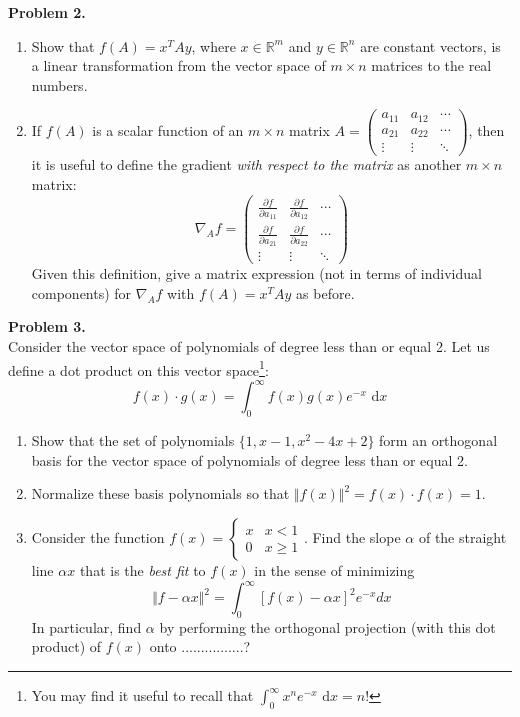 \documentclass[11pt]{article}
\newcommand{\diff}{\,\mathrm{d}}
\begin{document}
\noindent \textbf{Problem 2.}\\
\begin{enumerate}
\item Show that $f(A) = x^T A y$, where $x\in \mathbb{R}^m$ and $y\in \mathbb{R}^n$ are constant vectors, is a linear transformation from the vector space of $m\times n$ matrices to the real numbers.
\item If $f(A)$ is a scalar function of an $m\times n$ matrix $A = \begin{pmatrix} a_{11} & a_{12} & \cdots \\ a_{21} & a_{22} & \cdots \\ \vdots & \vdots & \ddots \end{pmatrix}$, then it is useful to define the gradient \emph{with respect to the matrix} as another $m\times n$ matrix:
$$
\nabla_A f = \begin{pmatrix} \frac{\partial f}{\partial a_{11}} & \frac{\partial f}{\partial a_{12}} & \cdots \\ \frac{\partial f}{\partial a_{21}} & \frac{\partial f}{\partial a_{22}} & \cdots \\ \vdots & \vdots & \ddots \end{pmatrix}
$$
Given this definition, give a matrix expression (not in terms of individual components) for $\nabla_A f$ with $f(A) = x^T A y$ as before.
\end{enumerate}

\newpage

\noindent \textbf{Problem 3.}\\
Consider the vector space of polynomials of degree less than or equal 2. Let us define a dot product on this vector space\footnote{You may find it useful to recall that $\int_0^{\infty} x^n e^{-x}\,\diff x = n!$}:
$$f(x)\cdot g(x) = \int_0^{\infty} f(x)g(x) e^{-x} \, \diff x$$
\begin{enumerate}
\item Show that the set of polynomials $\{1, x-1,x^2-4x+2 \}$ form an orthogonal basis for the vector space of polynomials of degree less than or equal 2.
\item Normalize these basis polynomials so that $\Vert f(x) \Vert^2 = f(x)\cdot f(x) = 1$.
\item Consider the function $f(x) = \begin{cases} x & x < 1 \\ 0 & x \ge 1 \end{cases}$.   Find the slope $\alpha$ of the straight line $\alpha x$ that is the \emph{best fit} to $f(x)$ in the sense of minimizing
$$
\Vert f - \alpha x \Vert^2 = \int_0^\infty \left[ f(x) - \alpha x \right]^2 e^{-x} dx
$$
In particular, find $\alpha$ by performing the orthogonal projection (with this dot product) of $f(x)$ onto ................?
\end{enumerate}
\end{document}
